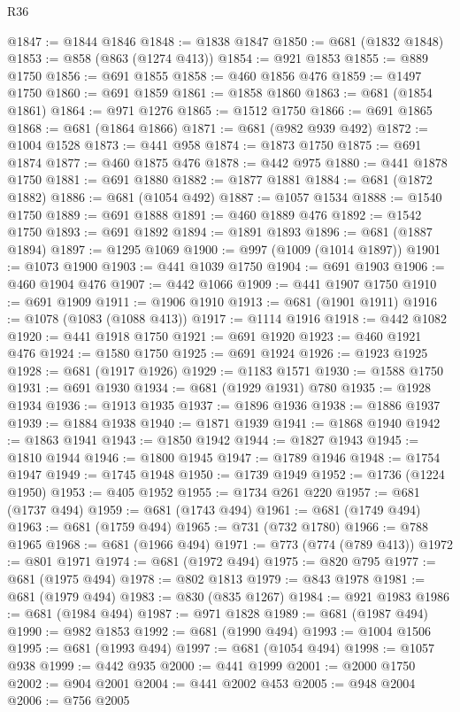\begin{lexlean}{R36}
\begin{coremodule}
@1847 := @1844 @1846
@1848 := @1838 @1847
@1850 := @681 (@1832 @1848)
@1853 := @858 (@863 (@1274 @413))
@1854 := @921 @1853
@1855 := @889 @1750
@1856 := @691 @1855
@1858 := @460 @1856 @476
@1859 := @1497 @1750
@1860 := @691 @1859
@1861 := @1858 @1860
@1863 := @681 (@1854 @1861)
@1864 := @971 @1276
@1865 := @1512 @1750
@1866 := @691 @1865
@1868 := @681 (@1864 @1866)
@1871 := @681 (@982 @939 @492)
@1872 := @1004 @1528
@1873 := @441 @958
@1874 := @1873 @1750
@1875 := @691 @1874
@1877 := @460 @1875 @476
@1878 := @442 @975
@1880 := @441 @1878 @1750
@1881 := @691 @1880
@1882 := @1877 @1881
@1884 := @681 (@1872 @1882)
@1886 := @681 (@1054 @492)
@1887 := @1057 @1534
@1888 := @1540 @1750
@1889 := @691 @1888
@1891 := @460 @1889 @476
@1892 := @1542 @1750
@1893 := @691 @1892
@1894 := @1891 @1893
@1896 := @681 (@1887 @1894)
@1897 := @1295 @1069
@1900 := @997 (@1009 (@1014 @1897))
@1901 := @1073 @1900
@1903 := @441 @1039 @1750
@1904 := @691 @1903
@1906 := @460 @1904 @476
@1907 := @442 @1066
@1909 := @441 @1907 @1750
@1910 := @691 @1909
@1911 := @1906 @1910
@1913 := @681 (@1901 @1911)
@1916 := @1078 (@1083 (@1088 @413))
@1917 := @1114 @1916
@1918 := @442 @1082
@1920 := @441 @1918 @1750
@1921 := @691 @1920
@1923 := @460 @1921 @476
@1924 := @1580 @1750
@1925 := @691 @1924
@1926 := @1923 @1925
@1928 := @681 (@1917 @1926)
@1929 := @1183 @1571
@1930 := @1588 @1750
@1931 := @691 @1930
@1934 := @681 (@1929 @1931) @780
@1935 := @1928 @1934
@1936 := @1913 @1935
@1937 := @1896 @1936
@1938 := @1886 @1937
@1939 := @1884 @1938
@1940 := @1871 @1939
@1941 := @1868 @1940
@1942 := @1863 @1941
@1943 := @1850 @1942
@1944 := @1827 @1943
@1945 := @1810 @1944
@1946 := @1800 @1945
@1947 := @1789 @1946
@1948 := @1754 @1947
@1949 := @1745 @1948
@1950 := @1739 @1949
@1952 := @1736 (@1224 @1950)
@1953 := @405 @1952
@1955 := @1734 @261 @220
@1957 := @681 (@1737 @494)
@1959 := @681 (@1743 @494)
@1961 := @681 (@1749 @494)
@1963 := @681 (@1759 @494)
@1965 := @731 (@732 @1780)
@1966 := @788 @1965
@1968 := @681 (@1966 @494)
@1971 := @773 (@774 (@789 @413))
@1972 := @801 @1971
@1974 := @681 (@1972 @494)
@1975 := @820 @795
@1977 := @681 (@1975 @494)
@1978 := @802 @1813
@1979 := @843 @1978
@1981 := @681 (@1979 @494)
@1983 := @830 (@835 @1267)
@1984 := @921 @1983
@1986 := @681 (@1984 @494)
@1987 := @971 @1828
@1989 := @681 (@1987 @494)
@1990 := @982 @1853
@1992 := @681 (@1990 @494)
@1993 := @1004 @1506
@1995 := @681 (@1993 @494)
@1997 := @681 (@1054 @494)
@1998 := @1057 @938
@1999 := @442 @935
@2000 := @441 @1999
@2001 := @2000 @1750
@2002 := @904 @2001
@2004 := @441 @2002 @453
@2005 := @948 @2004
@2006 := @756 @2005

\end{coremodule}
\end{lexlean}
